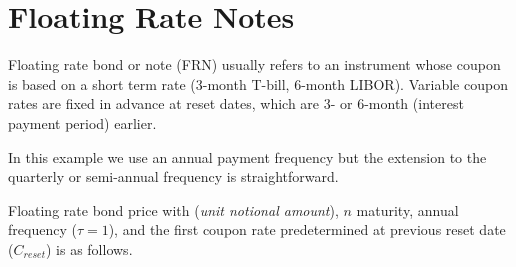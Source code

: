 \documentclass[12pt,a4paper]{book}
\begin{document}
%
%
%

\section{Floating Rate Notes}
Floating rate bond or note (FRN) usually refers to an instrument whose coupon is based on a short term rate (3-month T-bill, 6-month LIBOR). Variable coupon rates are fixed in advance at reset dates, which are 3- or 6-month (interest payment period) earlier.

In this example we use an annual payment frequency but the extension to the quarterly or semi-annual frequency is straightforward.

Floating rate bond price with (\emph{unit notional amount}), $n$ maturity, annual frequency ($\tau=1$), and the first coupon rate predetermined at previous reset date ($C_{reset}$) is as follows.
\end{document}
